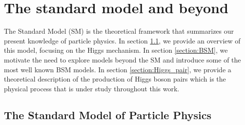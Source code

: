 
\chapter{The standard model and beyond}
\label{chapter:SM}

The Standard Model (SM) is the theoretical framework that summarizes our present knowledge of particle physics. In section \ref{section:overview_SM}, we provide an overview of this model, focusing on the Higgs mechanism. In section \ref{section:BSM}, we motivate the need to explore models beyond the SM and introduce some of the most well known BSM models. In section \ref{section:Higgs_pair}, we provide a theoretical description of the production of Higgs boson pairs which is the physical process that is under study throughout this work.


\section{The Standard Model of Particle Physics}
\label{section:overview_SM}

